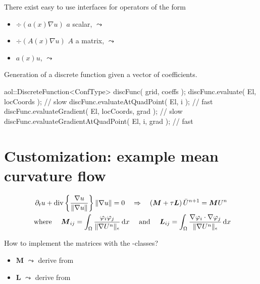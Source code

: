 There exist easy to use interfaces for operators of the form
\begin{itemize}
\item $\div( a(x) \nabla u )$ $a$ scalar, $\leadsto$ 
\item $\div( A(x) \nabla u )$ $A$ a matrix, $\leadsto$ 
\item $a(x) u$, $\leadsto$ 
\end{itemize}

Generation of a discrete function given a vector of coefficients.
\begin{myverbatim}
aol::DiscreteFunction<ConfType> discFunc( grid, coeffs );
discFunc.evaluate( El, locCoords );     // slow
discFunc.evaluateAtQuadPoint( El, i );  // fast
discFunc.evaluateGradient( El, locCoords, grad );     // slow
discFunc.evaluateGradientAtQuadPoint( El, i, grad );  // fast
\end{myverbatim}

\section{Customization: example mean curvature flow}
\begin{multline*}
\partial_t u + \mathrm{div}\left\{ \frac {\nabla u}{\|\nabla u\|} \right\} \|\nabla u\| = 0 \quad \Rightarrow \quad
\left(\boldsymbol{M}+ \tau \boldsymbol{L}\right) \bar U^{n+1} = \boldsymbol{M} U^n \\
\mbox{ where } \quad \boldsymbol{M}_{ij} = \int_\Omega \frac {\varphi_i \varphi_j}{\|\nabla U^{n} \|_\epsilon } \,\mathrm{d}x \quad \mbox{ and } \quad \boldsymbol{L}_{ij} = \int_\Omega \frac {\nabla \varphi_i \cdot \nabla \varphi_j}{\|\nabla U^{n} \|_\epsilon } \,\mathrm{d}x
\end{multline*}

How to implement the matrices with the -classes?

\begin{itemize}
\item $\boldsymbol{M}$ $\leadsto$ derive from 
\item $\boldsymbol{L}$ $\leadsto$ derive from 
\end{itemize}

